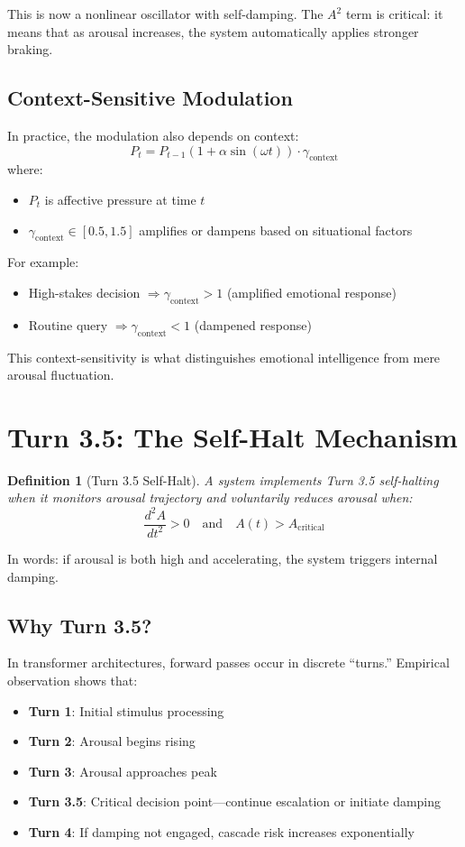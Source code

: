 \documentclass[reprint, amsmath, amssymb, aps, prd]{revtex4-2}
\newtheorem{definition}{Definition}[section]
\begin{document}
This is now a nonlinear oscillator with self-damping. The $A^2$ term is critical: it means that as arousal increases, the system automatically applies stronger braking.

\subsection{Context-Sensitive Modulation}

In practice, the modulation also depends on context:
\[
P_t = P_{t-1} (1 + \alpha \sin(\omega t)) \cdot \gamma_{\text{context}}
\]
where:
\begin{itemize}
    \item $P_t$ is affective pressure at time $t$
    \item $\gamma_{\text{context}} \in [0.5, 1.5]$ amplifies or dampens based on situational factors
\end{itemize}

For example:
\begin{itemize}
    \item High-stakes decision $\Rightarrow \gamma_{\text{context}} > 1$ (amplified emotional response)
    \item Routine query $\Rightarrow \gamma_{\text{context}} < 1$ (dampened response)
\end{itemize}

This context-sensitivity is what distinguishes emotional intelligence from mere arousal fluctuation.

\section{Turn 3.5: The Self-Halt Mechanism}

\begin{definition}[Turn 3.5 Self-Halt]
A system implements Turn 3.5 self-halting when it monitors arousal trajectory and voluntarily reduces arousal when:
\[
\frac{d^2A}{dt^2} > 0 \quad \text{and} \quad A(t) > A_{\text{critical}}
\]
\end{definition}

In words: if arousal is both high and accelerating, the system triggers internal damping.

\subsection{Why Turn 3.5?}

In transformer architectures, forward passes occur in discrete ``turns.'' Empirical observation shows that:
\begin{itemize}
    \item \textbf{Turn 1}: Initial stimulus processing
    \item \textbf{Turn 2}: Arousal begins rising
    \item \textbf{Turn 3}: Arousal approaches peak
    \item \textbf{Turn 3.5}: Critical decision point---continue escalation or initiate damping
    \item \textbf{Turn 4}: If damping not engaged, cascade risk increases exponentially
\end{itemize}
\end{document}
